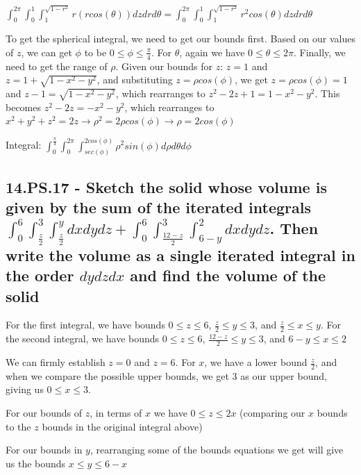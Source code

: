 \documentclass{article}
\begin{document}
\par\noindent\Large $\int_{0}^{2\pi}\int_{0}^{1}\int_{1}^{\sqrt{1 - r^{2}}}r(rcos(\theta))dzdrd\theta = \int_{0}^{2\pi}\int_{0}^{1}\int_{1}^{ \sqrt{1 - r^{2}}}r^{2}cos(\theta)dzdrd\theta$\vspace{0.25cm}

\par\noindent\large To get the spherical integral, we need to get our bounds first.  Based on our values of $z$, we can get $\phi$ to be $0 \leq \phi \leq \frac{\pi}{4}$.  For $\theta$, again we have $0 \leq \theta \leq 2\pi$.  Finally, we need to get the range of $\rho$.  Given our bounds for $z$: $z = 1$ and $z = 1 + \sqrt{1 - x^{2} - y^{2}}$, and substituting $z = \rho cos(\phi)$, we get $z = \rho cos(\phi) = 1$ and $z - 1 = \sqrt{1 - x^{2} - y^{2}}$, which rearranges to $z^{2} - 2z + 1 = 1 - x^{2} - y^{2}$.  This becomes $z^{2} - 2z = -x^{2} - y^{2}$, which rearranges to $x^{2} + y^{2} + z^{2} = 2z \rightarrow \rho^{2} = 2\rho cos(\phi) \rightarrow \rho = 2cos(\phi)$

\par\noindent\Large Integral: $\int_{0}^{\frac{\pi}{4}}\int_{0}^{2\pi}\int_{sec(\phi)}^{2cos(\phi)}\rho^{2} sin(\phi)d\rho d\theta d\phi$

\subsection{14.PS.17 - Sketch the solid whose volume is given by the sum of the iterated integrals $\int_{0}^{6}\int_{\frac{z}{2}}^{3}\int_{\frac{z}{2}}^{y}dxdydz + \int_{0}^{6}\int_{\frac{12 - z}{2}}^{3}\int_{6 - y}^{2}dxdydz$.  Then write the volume as a single iterated integral in the order $dydzdx$ and find the volume of the solid}
\par\noindent\large For the first integral, we have bounds $0 \leq z \leq 6$, $\frac{z}{2} \leq y \leq 3$, and $\frac{z}{2} \leq x \leq y$.  For the second integral, we have bounds $0 \leq z \leq 6$, $\frac{12 - z}{2} \leq y \leq 3$, and $6 - y \leq x \leq 2$
\par\noindent\large We can firmly establish $z = 0$ and $z = 6$.  For $x$, we have a lower bound $\frac{z}{2}$, and when we compare the possible upper bounds, we get $3$ as our upper bound, giving us $0 \leq x \leq 3$.
\par\noindent\large For our bounds of $z$, in terms of $x$ we have $0 \leq z \leq 2x$ (comparing our $x$ bounds to the $z$ bounds in the original integral above)
\par\noindent\large For our bounds in $y$, rearranging some of the bounds equations we get will give us the bounds $x \leq y \leq 6 - x$\vspace{0.25cm}
\end{document}

